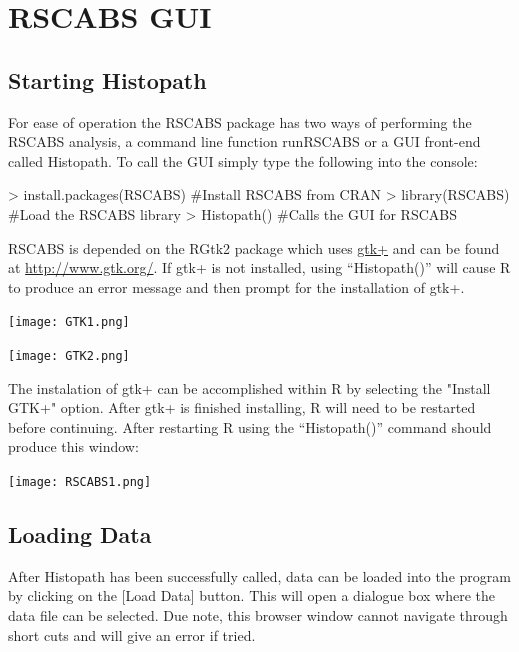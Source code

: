 \documentclass[a4paper]{article}
\begin{document}
	
\section*{RSCABS GUI}
\label{sec:RSCABSGUI}
\thispagestyle{plain}
\subsection*{Starting Histopath}
\label{subsec:Start}
	For ease of operation the RSCABS package has two ways of performing the RSCABS analysis, 
	a command line function runRSCABS or a 
	GUI front-end called Histopath. To call the GUI simply type the following into the console:   		

\begin{RBox}
> install.packages(RSCABS)	#Install RSCABS from CRAN
> library(RSCABS)			#Load the RSCABS library
> Histopath()				#Calls the GUI for RSCABS
\end{RBox}


\par
RSCABS is depended on the RGtk2 package which uses \href{http://www.gtk.org/}{gtk+} and can be found at \url{http://www.gtk.org/}.
If gtk+ is not installed, using ``Histopath()'' will cause R to produce an error message and then prompt for the installation of gtk+.  

\begin{center}
\texttt{[image: GTK1.png]}
\end{center} 

\begin{center}
\texttt{[image: GTK2.png]}
\end{center} 

The instalation of gtk+ can be accomplished within R by selecting the "Install GTK+" option. 
After gtk+ is finished installing, R will need to be restarted before continuing. 
After restarting R using the ``Histopath()'' command should produce this window:
 
\begin{center}
\texttt{[image: RSCABS1.png]}
\end{center} 
\subsection*{Loading Data}
\label{subsec:Data}

After Histopath has been successfully called, data can be loaded into the program by clicking on the [Load Data] button.  This will open a dialogue
box where the data file can be selected. Due note, this browser window cannot navigate through short cuts and will give an error if tried. 
\end{document}
